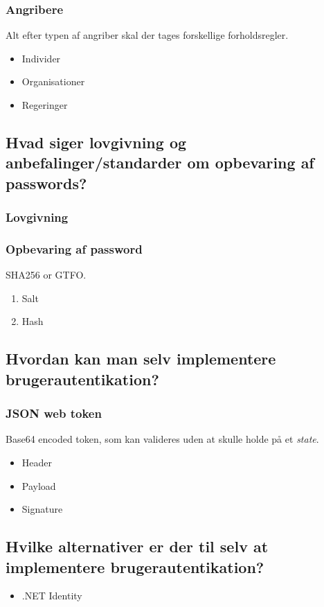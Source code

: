\subsubsection{Angribere}
Alt efter typen af angriber skal der tages forskellige forholdsregler.

\begin{itemize}
	\item Individer
	\item Organisationer
	\item Regeringer
\end{itemize}

\subsection{Hvad siger lovgivning og anbefalinger/standarder om opbevaring af passwords?}

\subsubsection{Lovgivning}

\subsubsection{Opbevaring af password}
SHA256 or GTFO.

\begin{enumerate}
	\item Salt
	\item Hash
\end{enumerate}

\subsection{Hvordan kan man selv implementere brugerautentikation?}

\subsubsection{JSON web token}
Base64 encoded token, som kan valideres uden at skulle holde på et \textit{state}.

\begin{itemize}
	\item Header
	\item Payload
	\item Signature
\end{itemize}

\subsection{Hvilke alternativer er der til selv at implementere brugerautentikation?}

\begin{itemize}
	\item .NET Identity
\end{itemize}

